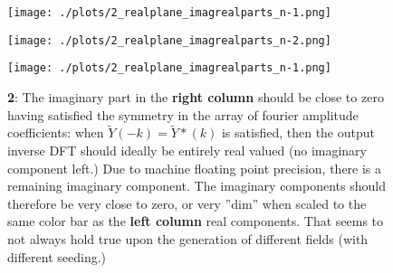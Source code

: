 \begin{figure}[h!]
  \centering
  \texttt{[image: ./plots/2\_realplane\_imagrealparts\_n-1.png]}
  \label{fig:imagrealparts}
\end{figure}

\begin{figure}[h!]
  \centering
  \texttt{[image: ./plots/2\_realplane\_imagrealparts\_n-2.png]}
  \label{fig:imagrealparts}
\end{figure}

\begin{figure}[h!]
  \centering
  \texttt{[image: ./plots/2\_realplane\_imagrealparts\_n-1.png]}
  \caption{\textbf{2}: The imaginary part in the \textbf{right column} should be close to zero having satisfied the symmetry in the array of fourier amplitude coefficients: when $\widetilde{Y}(-k)=\widetilde{Y}*(k)$ is satisfied, then the output inverse DFT should ideally be entirely real valued (no imaginary component left.) Due to machine floating point precision, there is a remaining imaginary component. The imaginary components should therefore be very close to zero, or very ''dim'' when scaled to the same color bar as the \textbf{left column} real components. That seems to not always hold true upon the generation of different fields (with different seeding.)}
  \label{fig:imagrealparts}
\end{figure}


